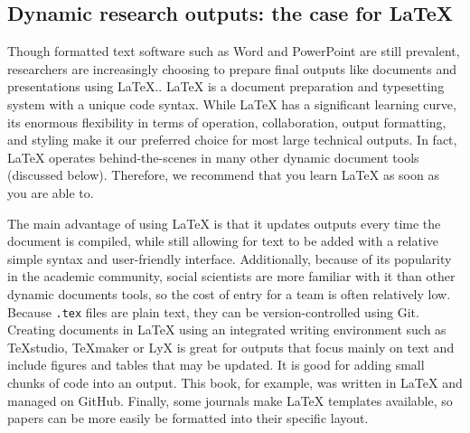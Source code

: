 \subsection{Dynamic research outputs: the case for {\LaTeX}}

Though formatted text software such as Word and PowerPoint are still prevalent,
researchers are increasingly choosing to prepare final outputs
like documents and presentations using {\LaTeX}.\index{{\LaTeX}}.
{\LaTeX} is a document preparation and typesetting system with a unique code syntax.
While {\LaTeX} has a significant learning curve,
its enormous flexibility in terms of operation, collaboration, output formatting, and styling
make it our preferred choice for most large technical outputs.
In fact, {\LaTeX} operates behind-the-scenes in many other dynamic document tools (discussed below).
Therefore, we recommend that you learn {\LaTeX} as soon as you are able to.

The main advantage of using {\LaTeX} is that it updates outputs every time the document is compiled,
while still allowing for text to be added with a relative simple syntax and user-friendly interface.
Additionally, because of its popularity in the academic community,
social scientists are more familiar with it than other dynamic documents tools,
so the cost of entry for a team is often relatively low.
Because \texttt{.tex} files are plain text, 
they can be version-controlled using Git.
Creating documents in {\LaTeX} using an integrated writing environment such as TeXstudio, TeXmaker or LyX
is great for outputs that focus mainly on text
and include figures and tables that may be updated.
It is good for adding small chunks of code into an output.
This book, for example, was written in {\LaTeX} and managed on GitHub.
Finally, some journals make {\LaTeX} templates available,
so papers can be more easily be formatted into their specific layout. 
	

